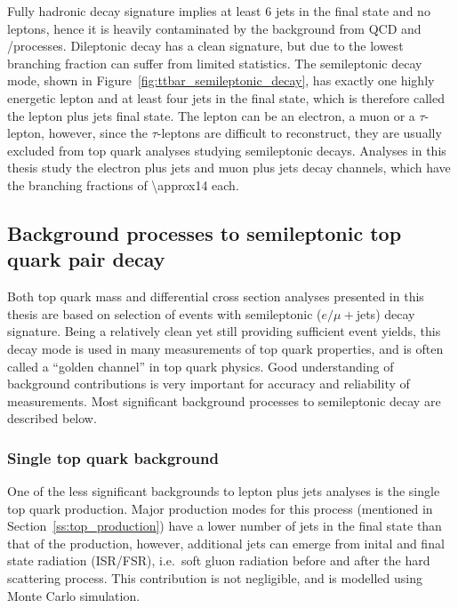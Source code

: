 Fully hadronic \ttbar decay signature implies at least 6 jets in the final state and no leptons, hence it is heavily
contaminated by the background from QCD and \W/\ZpJets processes. Dileptonic \ttbar decay has a clean signature, but due
to the lowest branching fraction can suffer from limited statistics. The semileptonic decay mode, shown in
Figure~\ref{fig:ttbar_semileptonic_decay}, has exactly one highly energetic lepton and at least four jets in the final
state, which is therefore called the lepton plus jets final state. The lepton can be an electron, a muon or a
$\tau$-lepton, however, since the $\tau$-leptons are difficult to reconstruct, they are usually excluded from top quark
analyses studying semileptonic decays. Analyses in this thesis study the electron plus jets and muon plus jets decay
channels, which have the branching fractions of \SI{\approx14}{\pc} each.



\newpage
\subsection{Background processes to semileptonic top quark pair decay}
\label{ss:backgrounds}
Both top quark mass and differential cross section analyses presented in this thesis are based on selection of events
with semileptonic ($e/\mu+$jets) \ttbar decay signature. Being a relatively clean yet still providing sufficient event
yields, this decay mode is used in many measurements of top quark properties, and is often called a ``golden channel''
in top quark physics. Good understanding of background contributions is very important for accuracy and reliability of
measurements. Most significant background processes to semileptonic \ttbar decay are described below.

\subsubsection*{Single top quark background}
One of the less significant backgrounds to lepton plus jets analyses is the single top quark production. Major
production modes for this process (mentioned in Section~\ref{ss:top_production}) have a lower number of jets in the
final state than that of the \ttbar production, however, additional jets can emerge from inital and final state
radiation (ISR/FSR), i.e.\ soft gluon radiation before and after the hard scattering process. This contribution is not
negligible, and is modelled using Monte Carlo simulation.


